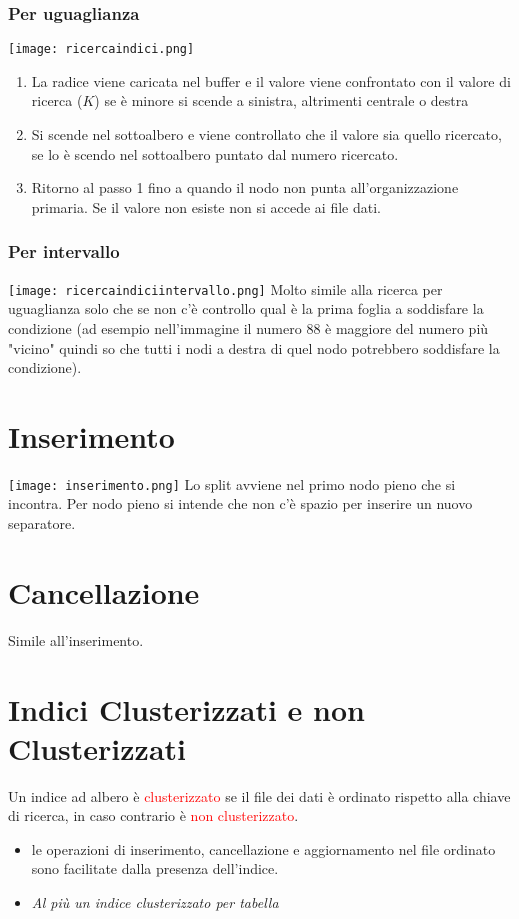 \documentclass[12pt]{article}
\begin{document}
\subsubsection{Per uguaglianza}
\texttt{[image: ricercaindici.png]}
\begin{enumerate}
    \item La radice viene caricata nel buffer e il valore viene confrontato con il valore di ricerca ($K$) se è minore si scende a sinistra, altrimenti centrale o destra
    \item Si scende nel sottoalbero e viene controllato che il valore sia quello ricercato, se lo è scendo nel sottoalbero puntato dal numero ricercato.
    \item Ritorno al passo 1 fino a quando il nodo non punta all'organizzazione primaria. Se il valore non esiste non si accede ai file dati.
\end{enumerate}
\subsubsection{Per intervallo}
\texttt{[image: ricercaindiciintervallo.png]}
Molto simile alla ricerca per uguaglianza solo che se non c'è controllo qual è la prima foglia a soddisfare la condizione (ad esempio nell'immagine il numero 88 è maggiore del numero più "vicino" quindi so che tutti i nodi a destra di quel nodo potrebbero soddisfare la condizione).
\section{Inserimento}
\texttt{[image: inserimento.png]}
Lo split avviene nel primo nodo pieno che si incontra. Per nodo pieno si intende che non c'è spazio per inserire un nuovo separatore.
\section{Cancellazione}
Simile all'inserimento.
\section{Indici Clusterizzati e non Clusterizzati}
Un indice ad albero è \textcolor{red}{clusterizzato} se il file dei dati è ordinato rispetto alla chiave di ricerca, in caso contrario è \textcolor{red}{non clusterizzato}.
\begin{itemize}
    \item le operazioni di inserimento, cancellazione e aggiornamento nel file ordinato sono facilitate dalla presenza dell'indice.
    \item \textit{Al più un indice clusterizzato per tabella}
\end{itemize}
\end{document}
